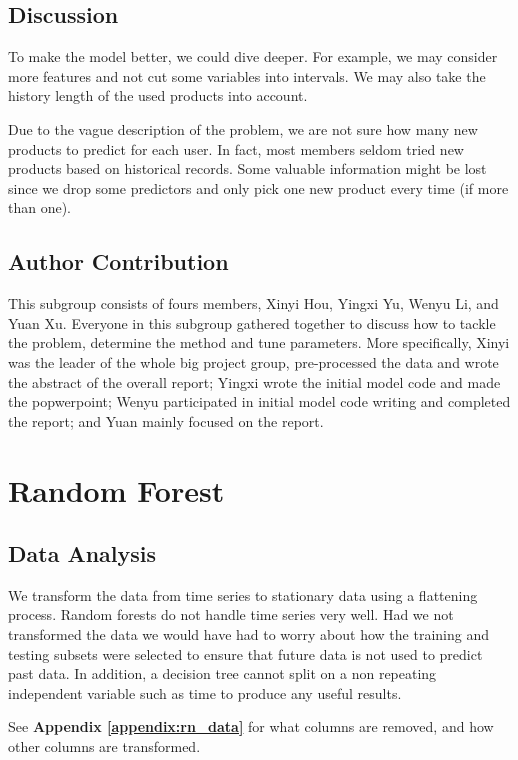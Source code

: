 \documentclass{article}
\begin{document}
\begin{spacing}{1}
\begin{large}
\subsection{Discussion}

To make the model better, we could dive deeper. For example, we may consider more features and not cut some variables into intervals. We may also take the history length of the used products into account.

Due to the vague description of the problem, we are not sure how many new products to predict for each user. In fact, most members seldom tried new products based on historical records. Some valuable information might be lost since we drop some predictors and only pick one new product every time (if more than one).


\subsection{Author Contribution}

This subgroup consists of fours members, Xinyi Hou, Yingxi Yu, Wenyu Li, and Yuan Xu. Everyone in this subgroup gathered together to discuss how to tackle the problem, determine the method and tune parameters. More specifically, Xinyi was the leader of the whole big project group, pre-processed the data and wrote the abstract of the overall report; Yingxi wrote the initial model code and made the popwerpoint; Wenyu participated in initial model code writing and completed the report; and Yuan mainly focused on the report.

\section{Random Forest}
	
\subsection{Data Analysis}

We transform the data from time series to stationary data using a flattening process. Random forests do not handle time series very well. Had we not transformed the data we would have had to worry about how the training and testing subsets were selected to ensure that future data is not used to predict past data. In addition, a decision tree cannot split on a non repeating independent variable such as time to produce any useful results.

See \textbf{Appendix \ref{appendix:rn_data}} for what columns are removed, and how other columns are transformed.



\end{large}
\end{spacing}
\end{document}
